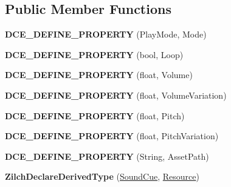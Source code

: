 \subsection*{Public Member Functions}
\begin{DoxyCompactItemize}
\item 
\hypertarget{classDCEngine_1_1SoundCue_ae5d0fb72f67d5f741aac8a25f8e93c20}{{\bfseries D\-C\-E\-\_\-\-D\-E\-F\-I\-N\-E\-\_\-\-P\-R\-O\-P\-E\-R\-T\-Y} (Play\-Mode, Mode)}\label{classDCEngine_1_1SoundCue_ae5d0fb72f67d5f741aac8a25f8e93c20}

\item 
\hypertarget{classDCEngine_1_1SoundCue_ad3827ddbc52099513095099d4a26cb50}{{\bfseries D\-C\-E\-\_\-\-D\-E\-F\-I\-N\-E\-\_\-\-P\-R\-O\-P\-E\-R\-T\-Y} (bool, Loop)}\label{classDCEngine_1_1SoundCue_ad3827ddbc52099513095099d4a26cb50}

\item 
\hypertarget{classDCEngine_1_1SoundCue_a0f30316da5d29359fecf41e1746bba6c}{{\bfseries D\-C\-E\-\_\-\-D\-E\-F\-I\-N\-E\-\_\-\-P\-R\-O\-P\-E\-R\-T\-Y} (float, Volume)}\label{classDCEngine_1_1SoundCue_a0f30316da5d29359fecf41e1746bba6c}

\item 
\hypertarget{classDCEngine_1_1SoundCue_a662bb7255207e22dc060689885dfa0b0}{{\bfseries D\-C\-E\-\_\-\-D\-E\-F\-I\-N\-E\-\_\-\-P\-R\-O\-P\-E\-R\-T\-Y} (float, Volume\-Variation)}\label{classDCEngine_1_1SoundCue_a662bb7255207e22dc060689885dfa0b0}

\item 
\hypertarget{classDCEngine_1_1SoundCue_a3cf42a5d9c1f0f9a07d148e28225fe0e}{{\bfseries D\-C\-E\-\_\-\-D\-E\-F\-I\-N\-E\-\_\-\-P\-R\-O\-P\-E\-R\-T\-Y} (float, Pitch)}\label{classDCEngine_1_1SoundCue_a3cf42a5d9c1f0f9a07d148e28225fe0e}

\item 
\hypertarget{classDCEngine_1_1SoundCue_a27334c6703be5ef2b21744c386b687d2}{{\bfseries D\-C\-E\-\_\-\-D\-E\-F\-I\-N\-E\-\_\-\-P\-R\-O\-P\-E\-R\-T\-Y} (float, Pitch\-Variation)}\label{classDCEngine_1_1SoundCue_a27334c6703be5ef2b21744c386b687d2}

\item 
\hypertarget{classDCEngine_1_1SoundCue_a92fd920e5d4706f8185c2e0b756d50de}{{\bfseries D\-C\-E\-\_\-\-D\-E\-F\-I\-N\-E\-\_\-\-P\-R\-O\-P\-E\-R\-T\-Y} (String, Asset\-Path)}\label{classDCEngine_1_1SoundCue_a92fd920e5d4706f8185c2e0b756d50de}

\item 
\hypertarget{classDCEngine_1_1SoundCue_af49a90ecc83622a32bd2f84927f9f150}{{\bfseries Zilch\-Declare\-Derived\-Type} (\hyperlink{classDCEngine_1_1SoundCue}{Sound\-Cue}, \hyperlink{classDCEngine_1_1Resource}{Resource})}\label{classDCEngine_1_1SoundCue_af49a90ecc83622a32bd2f84927f9f150}


\end{DoxyCompactItemize}
